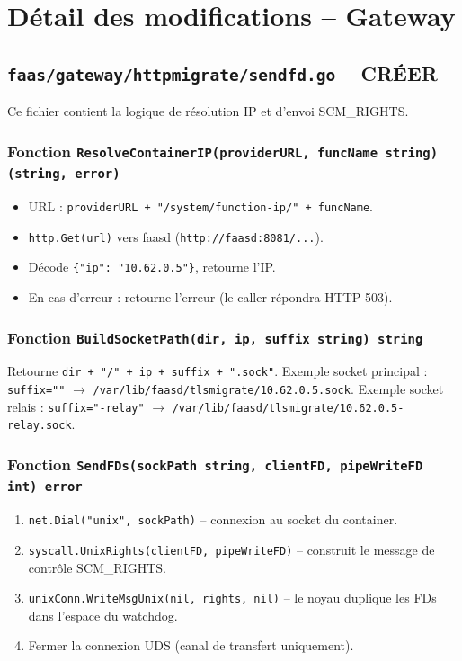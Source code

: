 \documentclass[11pt,a4paper]{article}
\begin{document}
\section{Détail des modifications -- Gateway}

\subsection{\texttt{faas/gateway/httpmigrate/sendfd.go} -- CRÉER}

Ce fichier contient la logique de résolution IP et d'envoi SCM\_RIGHTS.

\subsubsection{Fonction \texttt{ResolveContainerIP(providerURL, funcName string) (string, error)}}
\begin{itemize}
  \item URL : \texttt{providerURL + "/system/function-ip/" + funcName}.
  \item \texttt{http.Get(url)} vers faasd (\texttt{http://faasd:8081/...}).
  \item Décode \texttt{\{"ip": "10.62.0.5"\}}, retourne l'IP.
  \item En cas d'erreur : retourne l'erreur (le caller répondra HTTP 503).
\end{itemize}

\subsubsection{Fonction \texttt{BuildSocketPath(dir, ip, suffix string) string}}
Retourne \texttt{dir + "/" + ip + suffix + ".sock"}.
Exemple socket principal : \texttt{suffix=""} $\to$
\texttt{/var/lib/faasd/tlsmigrate/10.62.0.5.sock}.
Exemple socket relais : \texttt{suffix="-relay"} $\to$
\texttt{/var/lib/faasd/tlsmigrate/10.62.0.5-relay.sock}.

\subsubsection{Fonction \texttt{SendFDs(sockPath string, clientFD, pipeWriteFD int) error}}
\begin{enumerate}
  \item \texttt{net.Dial("unix", sockPath)} -- connexion au socket du container.
  \item \texttt{syscall.UnixRights(clientFD, pipeWriteFD)} -- construit le message de contrôle
    SCM\_RIGHTS.
  \item \texttt{unixConn.WriteMsgUnix(nil, rights, nil)} -- le noyau duplique les FDs
    dans l'espace du watchdog.
  \item Fermer la connexion UDS (canal de transfert uniquement).
\end{enumerate}
\end{document}
